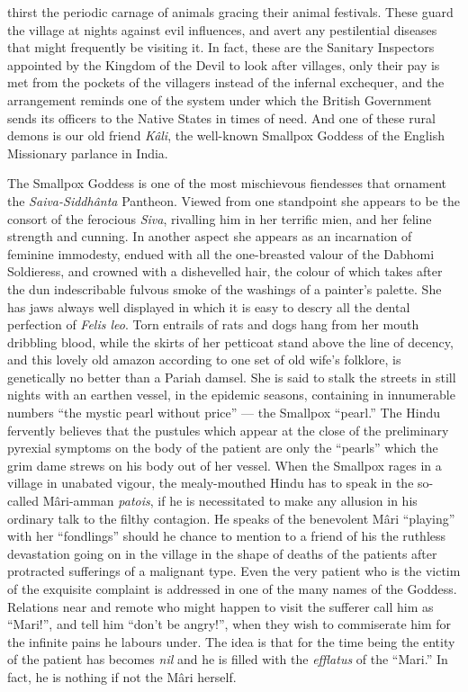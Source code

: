 \documentclass[a4paper, 12pt, oneside, english, twocolumn]{article}
\begin{document}
thirst the periodic carnage of animals gracing their animal festivals. These guard the village at nights against evil influences, and avert any pestilential diseases that might frequently be visiting it. In fact, these are the Sanitary Inspectors appointed by the Kingdom of the Devil to look after villages, only their pay is met from the pockets of the villagers instead of the infernal exchequer, and the arrangement reminds one of the system under which the British Government sends its officers to the Native States in times of need. And one of these rural demons is our old friend \emph{Kâli}, the well-known Smallpox Goddess of the English Missionary parlance in India.

The Smallpox Goddess is one of the most mischievous fiendesses that ornament the \emph{Saiva-Siddhânta} Pantheon. Viewed from one standpoint she appears to be the consort of the ferocious \emph{Siva}, rivalling him in her terrific mien, and her feline strength and cunning. In another aspect she appears as an incarnation of feminine immodesty, endued with all the one-breasted valour of the Dabhomi Soldieress, and crowned with a dishevelled hair, the colour of which takes after the dun indescribable fulvous smoke of the washings of a painter's palette. She has jaws always well displayed in which it is easy to descry all the dental perfection of \emph{Felis leo}. Torn entrails of rats and dogs hang from her mouth dribbling blood, while the skirts of her petticoat stand above the line of decency, and this lovely old amazon according to one set of old wife's folklore, is genetically no better than a Pariah damsel. She is said to stalk the streets in still nights with an earthen vessel, in the epidemic seasons, containing in innumerable numbers ``the mystic pearl without price'' --- the Smallpox ``pearl.'' The Hindu fervently believes that the pustules which appear at the close of the preliminary pyrexial symptoms on the body of the patient are only the ``pearls'' which the grim dame strews on his body out of her vessel. When the Smallpox rages in a village in unabated vigour, the mealy-mouthed Hindu has to speak in the so-called Mâri-amman \emph{patois}, if he is necessitated to make any allusion in his ordinary talk to the filthy contagion. He speaks of the benevolent Mâri ``playing'' with her ``fondlings'' should he chance to mention to a friend of his the ruthless devastation going on in the village in the shape of deaths of the patients after protracted sufferings of a malignant type. Even the very patient who is the victim of the exquisite complaint is addressed in one of the many names of the Goddess. Relations near and remote who might happen to visit the sufferer call him as ``Mari!'', and tell him ``don't be angry!'', when they wish to commiserate him for the infinite pains he labours under. The idea is that for the time being the entity of the patient has becomes \emph{nil} and he is filled with the \emph{efflatus} of the ``Mari.'' In fact, he is nothing if not the Mâri herself.
\end{document}
